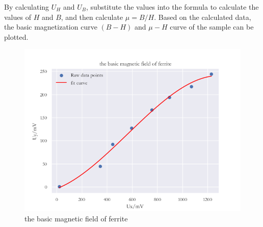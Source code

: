 \documentclass[UTF8]{article}
\begin{document}
  By calculating $U_H$ and $U_B$, substitute the values into the formula to calculate the values
  of $H$ and $B$, and then calculate $\mu = B/H$. Based on the calculated data, the basic
  magnetization curve $( B - H )$ and $\mu - H$ curve of the sample can be plotted.
    
         \begin{figure}[H]
               	    	\centering
               	    	\includegraphics[clip,scale=0.9,trim={0 0 0 0}]{fig/fig11.png}
               	        \caption{the basic magnetic field of ferrite}
               	        \label{figure.1}
                   \end{figure}   
   
\end{document}
